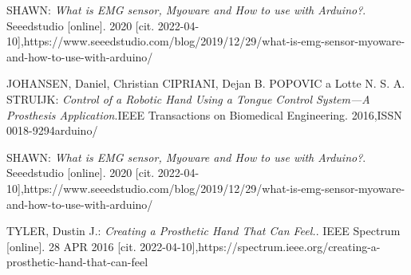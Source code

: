 \documentclass[a4paper,12pt]{article}
\begin{document}
\begin{thebibliography}{1}
      SHAWN:
    \emph{What is EMG sensor, Myoware and How to use with Arduino?}. Seeedstudio [online]. 2020 [cit. 2022-04-10],https://www.seeedstudio.com/blog/2019/12/29/what-is-emg-sensor-myoware-and-how-to-use-with-arduino/

	 JOHANSEN, Daniel, Christian CIPRIANI, Dejan B. POPOVIC a Lotte N. S. A. STRUIJK:
    	\emph{Control of a Robotic Hand Using a Tongue Control System—A Prosthesis Application}.IEEE Transactions on Biomedical Engineering. 2016,ISSN 0018-9294arduino/
    	
     SHAWN:
    	\emph{What is EMG sensor, Myoware and How to use with Arduino?}. Seeedstudio [online]. 2020 [cit. 2022-04-10],https://www.seeedstudio.com/blog/2019/12/29/what-is-emg-sensor-myoware-and-how-to-use-with-arduino/
    	
     TYLER, Dustin J.:
    	\emph{Creating a Prosthetic Hand That Can Feel.}. IEEE Spectrum [online]. 28 APR 2016 [cit. 2022-04-10],https://spectrum.ieee.org/creating-a-prosthetic-hand-that-can-feel
    
    
\end{thebibliography}
\end{document}
